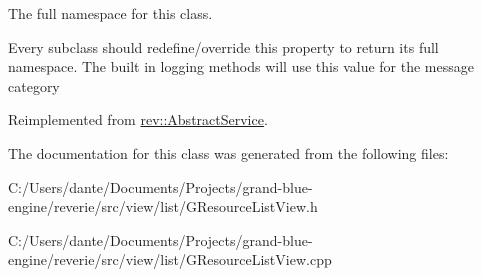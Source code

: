 The full namespace for this class. 

Every subclass should redefine/override this property to return its full namespace. The built in logging methods will use this value for the message category 

Reimplemented from \mbox{\hyperlink{classrev_1_1_abstract_service_a062e932eaa2eab0109288f2b32e459f7}{rev\+::\+Abstract\+Service}}.



The documentation for this class was generated from the following files\+:\begin{DoxyCompactItemize}
\item 
C\+:/\+Users/dante/\+Documents/\+Projects/grand-\/blue-\/engine/reverie/src/view/list/G\+Resource\+List\+View.\+h\item 
C\+:/\+Users/dante/\+Documents/\+Projects/grand-\/blue-\/engine/reverie/src/view/list/G\+Resource\+List\+View.\+cpp\end{DoxyCompactItemize}
